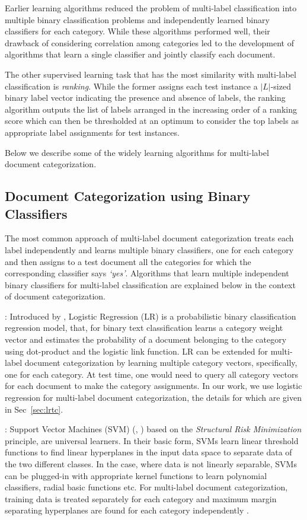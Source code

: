 Earlier learning algorithms reduced the problem of multi-label classification into multiple binary classification problems and independently learned binary classifiers for each category. While these algorithms performed well, their drawback of considering correlation among categories led to the development of algorithms that learn a single classifier and jointly classify each document. 

The other supervised learning task that has the most similarity with multi-label classification is \emph{ranking}. While the former assigns each test instance a $|L|$-sized binary label vector indicating the presence and absence of labels, the ranking algorithm outputs the list of labels arranged in the increasing order of a ranking score which can then be thresholded at an optimum to consider the top labels as appropriate label assignments for test instances.

Below we describe some of the widely learning algorithms for multi-label document categorization. 

\subsection{Document Categorization using Binary Classifiers}
\label{sec:rw_multiple_classifiers}
The most common approach of multi-label document categorization treats each label independently and learns multiple binary classifiers, one for each category and then assigns to a test document all the categories for which the corresponding classifier says \emph{`yes'}. Algorithms that learn multiple independent binary classifiers for multi-label classification are explained below in the context of document categorization.

 : Introduced by \cite{hosmer1989applied}, Logistic Regression (LR) is a probabilistic binary classification regression model, that, for binary text classification learns a category weight vector and estimates the probability of a document belonging to the category using dot-product and the logistic link function. LR can be extended for multi-label document categorization by learning multiple category vectors, specifically, one for each category. At test time, one would need to query all category vectors for each document to make the category assignments. In our work, we use logistic regression for multi-label document categorization, the details for which are given in Sec~\ref{sec:lrtc}.

 : Support Vector Machines (SVM) (\citep{cortes1995support}, \citep{vapnik2000nature}) based on the \emph{Structural Risk Minimization} principle, are universal learners. In their basic form, SVMs learn linear threshold functions to find linear hyperplanes in the input data space to separate data of the two different classes. In the case, where data is not linearly separable, SVMs can be plugged-in with appropriate kernel functions to learn polynomial classifiers, radial basic functions etc. For multi-label document categorization, training data is treated separately for each category and maximum margin separating hyperplanes are found for each category independently \citep{joachims1998text}.

